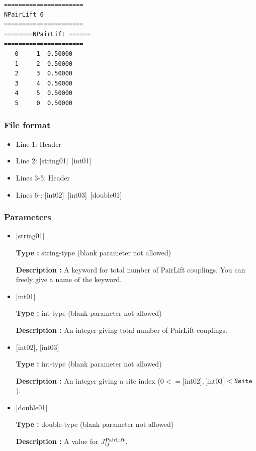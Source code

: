 \begin{minipage}{12.5cm}
\begin{screen}
\begin{verbatim}
====================== 
NPairLift 6  
====================== 
========NPairLift ====== 
====================== 
   0     1  0.50000
   1     2  0.50000
   2     3  0.50000
   3     4  0.50000
   4     5  0.50000
   5     0  0.50000
\end{verbatim}
\end{screen}
\end{minipage}

\subsubsection{File format}
 \begin{itemize}
   \item  Line 1:  Header
   \item  Line 2:   [string01]~[int01]
   \item  Lines 3-5:  Header
   \item  Lines 6-: 
   [int02]~[int03]~[double01] 
  \end{itemize}
\subsubsection{Parameters}
 \begin{itemize}

 \item  $[$string01$]$
   
    {\bf Type :} string-type (blank parameter not allowed)

   {\bf Description :}  A keyword for total number of PairLift couplings. You can freely give a name of the keyword.

   \item  $[$int01$]$
   
    {\bf Type :} int-type (blank parameter not allowed)

   {\bf Description :} An integer giving total number of PairLift couplings.

  \item  $[$int02$]$, $[$int03$]$
  
 {\bf Type :} int-type (blank parameter not allowed)

{\bf Description :} An integer giving a site index ($0<= [$int02$], [$int03$]<\verb|Nsite|$).
 
 \item  $[$double01$]$
   
   {\bf Type :} double-type (blank parameter not allowed)

  {\bf Description :}  A value for $J_{ij}^{\rm PairLift}$.
    
\end{itemize}

